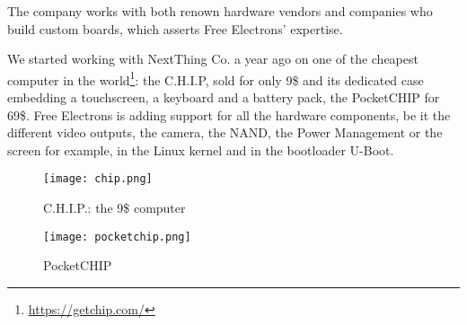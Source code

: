 The company works with both renown hardware vendors and companies who build custom boards, which asserts Free Electrons' expertise.

We started working with NextThing Co. a year ago on one of the cheapest computer in the world\footnote{\url{https://getchip.com/}}: the C.H.I.P, sold for only 9\$ and its dedicated case embedding a touchscreen, a keyboard and a battery pack, the PocketCHIP for 69\$. Free Electrons is adding support for all the hardware components, be it the different video outputs, the camera, the NAND, the Power Management or the screen for example, in the Linux kernel and in the bootloader U-Boot.

\begin{figure}[H]
  \centering
  \begin{minipage}[b]{0.45\textwidth}
    \texttt{[image: chip.png]}
    \caption{C.H.I.P.: the 9\$ computer}
  \end{minipage}
  \hfill
  \begin{minipage}[b]{0.45\textwidth}
    \centerline{\texttt{[image: pocketchip.png]}}
    \caption{PocketCHIP}
  \end{minipage}
\end{figure}
